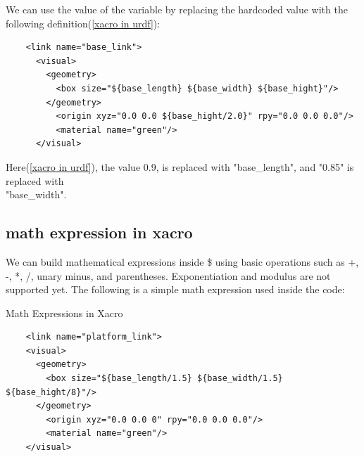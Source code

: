 \documentclass[../../main]{subfiles}
\begin{document}
We can use the value of the variable by replacing the hardcoded value with the following
definition(\cref{xacro in urdf}):
\begin{codebox}[label=xacro in urdf]{}
  \begin{verbatim}
    <link name="base_link">
      <visual>
        <geometry>
          <box size="${base_length} ${base_width} ${base_hight}"/>
        </geometry>
          <origin xyz="0.0 0.0 ${base_hight/2.0}" rpy="0.0 0.0 0.0"/>
          <material name="green"/>
      </visual>
\end{verbatim}
  \end{codebox}

Here(\cref{xacro in urdf}), the value 0.9, is replaced with "{base\_length}", and "0.85" is
replaced with \\"{base\_width}".

\subsection{math expression in xacro}
We can build mathematical expressions inside \${} using basic operations such as +, -, *,
/, unary minus, and parentheses. Exponentiation and modulus are not supported yet. The
following is a simple math expression used inside the code:
\begin{codebox}[]{Math Expressions in Xacro}
  \begin{verbatim}
    <link name="platform_link">
    <visual>
      <geometry>
        <box size="${base_length/1.5} ${base_width/1.5} ${base_hight/8}"/>
      </geometry>
        <origin xyz="0.0 0.0 0" rpy="0.0 0.0 0.0"/>
        <material name="green"/>
    </visual>
\end{verbatim}
\end{codebox}
\end{document}

